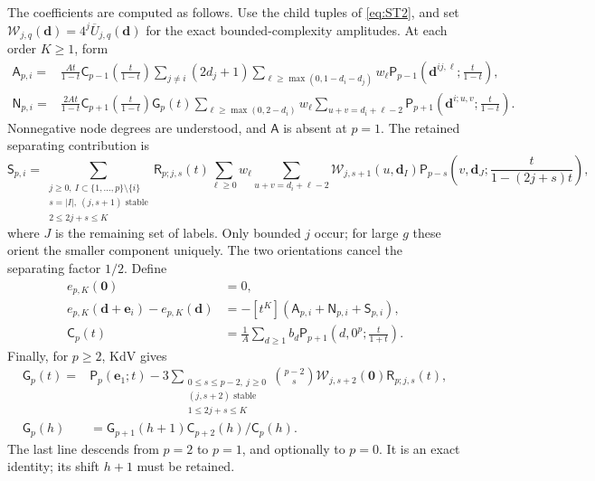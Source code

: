 The coefficients are computed as follows. Use the child tuples of
\eqref{eq:ST2}, and set $\mathcal W_{j,q}(\mathbf d)=4^j\overline
U_{j,q}(\mathbf d)$ for the exact bounded-complexity amplitudes.
At each order $K\ge1$, form
\begin{equation}
\begin{split}
 \mathsf A_{p,i}={}&\frac{At}{1-t}\mathsf C_{p-1}\!\left(\frac t{1-t}\right)
 \sum_{j\ne i}(2d_j+1)
 \sum_{\ell\ge\max(0,1-d_i-d_j)}w_\ell
 \mathsf P_{p-1}\!\left(\mathbf d^{ij,\ell};\frac t{1-t}\right),\\
 \mathsf N_{p,i}={}&\frac{2At}{1-t}\mathsf C_{p+1}\!\left(\frac t{1-t}\right)
 \mathsf G_p(t)\sum_{\ell\ge\max(0,2-d_i)}w_\ell
 \sum_{u+v=d_i+\ell-2}\mathsf P_{p+1}\!\left(\mathbf d^{i;u,v};\frac t{1-t}\right).
\end{split}
 \label{eq:FE3}
\end{equation}
Nonnegative node degrees are understood, and $\mathsf A$ is absent
at $p=1$. The retained separating contribution is
\begin{equation}
 \mathsf S_{p,i}=
 \sum_{\substack{j\ge0,\ I\subset\{1,\ldots,p\}\setminus\{i\}\\
        s=|I|,\ (j,s+1)\text{ stable}\\2\le2j+s\le K}}
 \mathsf R_{p;j,s}(t)\sum_{\ell\ge0}w_\ell
 \sum_{u+v=d_i+\ell-2}
 \mathcal W_{j,s+1}(u,\mathbf d_I)
 \mathsf P_{p-s}\!\left(v,\mathbf d_J;\frac t{1-(2j+s)t}\right),
 \label{eq:FE4}
\end{equation}
where $J$ is the remaining set of labels. Only bounded $j$ occur;
for large $g$ these orient the smaller component uniquely. The two
orientations cancel the separating factor $1/2$. Define
\begin{equation}
 \begin{split}
 e_{p,K}(\mathbf0)&=0,\\
 e_{p,K}(\mathbf d+\mathbf e_i)-e_{p,K}(\mathbf d)
   &=-[t^K](\mathsf A_{p,i}+\mathsf N_{p,i}+\mathsf S_{p,i}),\\
 \mathsf C_p(t)&=\frac1A\sum_{d\ge1}b_d
       \mathsf P_{p+1}\!\left(d,0^p;\frac t{1+t}\right).
 \end{split}
 \label{eq:FE5}
\end{equation}
Finally, for $p\ge2$, KdV gives
\begin{equation}
\begin{split}
 \mathsf G_p(t)={}&\mathsf P_p(\mathbf e_1;t)
 -3\sum_{\substack{0\le s\le p-2,\ j\ge0\\
             (j,s+2)\text{ stable}\\1\le2j+s\le K}}
  \binom{p-2}s\mathcal W_{j,s+2}(\mathbf0)\mathsf R_{p;j,s}(t),\\
 \mathsf G_p(h)&=\mathsf G_{p+1}(h+1)
                   \mathsf C_{p+2}(h)/\mathsf C_p(h).
\end{split}
 \label{eq:FE6}
\end{equation}
The last line descends from $p=2$ to $p=1$, and optionally to $p=0$.
It is an exact identity; its shift $h+1$ must be retained.

